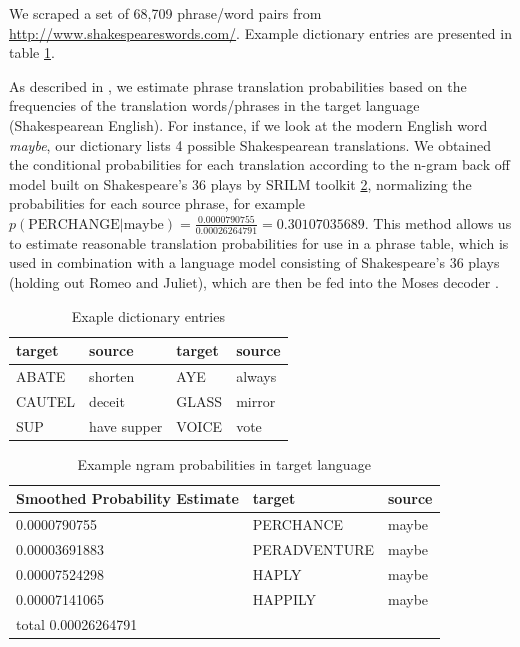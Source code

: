 \documentclass[10pt,a5paper,twoside]{article}
\begin{document}
We scraped a set of 68,709 phrase/word pairs from \url{http://www.shakespeareswords.com/}.  
Example dictionary entries are presented in table \ref{dictionary_example}. 

As described in \cite{Koehn00}, we estimate phrase translation probabilities based on the frequencies of the translation words/phrases in the target language (Shakespearean English).
For instance, if we look at the modern English word \emph{maybe}, our dictionary lists 4 possible Shakespearean translations. 
We obtained the conditional probabilities for each translation according to the n-gram back off model built on Shakespeare's 
36 plays by SRILM toolkit \cite{Stolcke02} \ref{word_frequency}, 
normalizing the probabilities for each source phrase, for example $p(\text{PERCHANGE}|\text{maybe}) = \frac{0.0000790755}{0.00026264791} = 0.30107035689$. 
This method allows us to estimate reasonable translation probabilities for use in a phrase table, which is used in combination 
with a language model consisting of Shakespeare's 36 plays (holding out Romeo and Juliet), which are then be fed into the Moses decoder
\cite{Koehn07}.

\begin{table}
  \begin{center}
  \begin{tabular}{|l|l||l|l|}
    \hline
    target & source & target & source \\
    \hline
    \hline
    ABATE & shorten & AYE & always \\
    \hline
    CAUTEL & deceit & GLASS & mirror \\
    \hline
    SUP & have supper & VOICE & vote \\
    \hline
  \end{tabular}
  \end{center}
  \caption{Exaple dictionary entries}
  \label{dictionary_example}
\end{table}

\begin{table}
  \begin{center}
  \begin{tabular}{|l|l|l|}
    \hline
    Smoothed Probability Estimate & target & source \\
    \hline
    \hline
    0.0000790755 & PERCHANCE & maybe \\
    \hline
    0.00003691883 & PERADVENTURE & maybe \\
    \hline
    0.00007524298 & HAPLY & maybe \\
    \hline
    0.00007141065 & HAPPILY & maybe \\
    \hline
    \hline
    total 0.00026264791 & & \\
    \hline
  \end{tabular}
  \end{center}
  \caption{Example ngram probabilities in target language}
  \label{word_frequency}
\end{table}
\end{document}
